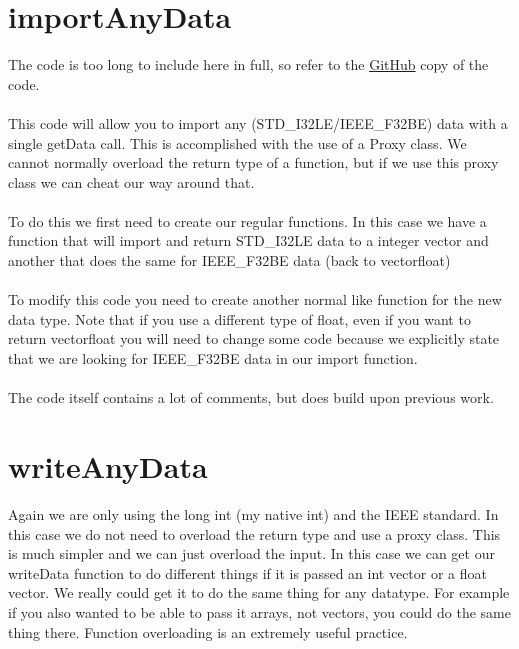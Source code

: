 \documentclass[11pt]{article}   %
\begin{document}
\section*{importAnyData}
The code is too long to include here in full, so refer to the \href{https://github.com/stevenwalton/tutorials/blob/master/h5/importAnyData.cpp}{GitHub} copy of the code.\\ \\
This code will allow you to import any (STD\_I32LE/IEEE\_F32BE) data with a single getData call. 
This is accomplished with the use of a Proxy class. We cannot normally overload the return type
of a function, but if we use this proxy class we can cheat our way around that. 
\\ \\
To do this we first need to create our regular functions. In this case we have a function that will
import and return STD\_I32LE data to a integer vector and another that does the same for IEEE\_F32BE
data (back to vector\textlangle{}float\textrangle{})
\\ \\
To modify this code you need to create another normal like function for the new data type. Note that
if you use a different type of float, even if you want to return vector\textlangle{}float\textrangle{}
you will need to change some code because we explicitly state that we are looking for IEEE\_F32BE
data in our import function.
\\ \\
The code itself contains a lot of comments, but does build upon previous work.

\section*{writeAnyData}
Again we are only using the long int (my native int) and the IEEE standard. In this case we do not need to overload the return type and use a proxy class. This is much simpler and
we can just overload the input. In this case we can get our writeData function to do different things if it is passed an int vector or a float vector. We really could get it to
do the same thing for any datatype. For example if you also wanted to be able to pass it arrays, not vectors, you could do the same thing there. Function overloading is an extremely
useful practice. 
\end{document}

